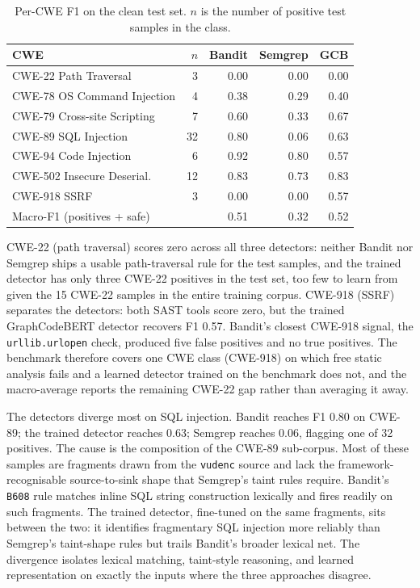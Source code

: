 \begin{table}[h]
\centering
\caption{Per-CWE F1 on the clean test set. $n$ is the number of
positive test samples in the class.}
\label{tab:clean-percwe}
\begin{tabular}{l r r r r}
\hline
CWE & $n$ & Bandit & Semgrep & GCB \\
\hline
CWE-22  Path Traversal        &  3 & 0.00 & 0.00 & 0.00 \\
CWE-78  OS Command Injection  &  4 & 0.38 & 0.29 & 0.40 \\
CWE-79  Cross-site Scripting  &  7 & 0.60 & 0.33 & 0.67 \\
CWE-89  SQL Injection         & 32 & 0.80 & 0.06 & 0.63 \\
CWE-94  Code Injection        &  6 & 0.92 & 0.80 & 0.57 \\
CWE-502 Insecure Deserial.    & 12 & 0.83 & 0.73 & 0.83 \\
CWE-918 SSRF                  &  3 & 0.00 & 0.00 & 0.57 \\
\hline
Macro-F1 (positives + safe)   &    & 0.51 & 0.32 & 0.52 \\
\hline
\end{tabular}
\end{table}

CWE-22 (path traversal) scores zero across all three detectors:
neither Bandit nor Semgrep ships a usable path-traversal rule for the
test samples, and the trained detector has only three CWE-22 positives
in the test set, too few to learn from given the 15 CWE-22 samples in
the entire training corpus. CWE-918 (SSRF) separates the detectors:
both SAST tools score zero, but the trained GraphCodeBERT detector
recovers F1 0.57. Bandit's closest CWE-918 signal, the
\texttt{urllib.urlopen} check, produced five false positives and no
true positives. The benchmark therefore covers one CWE class
(CWE-918) on which free static analysis fails and a learned detector
trained on the benchmark does not, and the macro-average reports the
remaining CWE-22 gap rather than averaging it away.

The detectors diverge most on SQL injection. Bandit reaches F1 0.80
on CWE-89; the trained detector reaches 0.63; Semgrep reaches 0.06,
flagging one of 32 positives. The cause is the composition of the
CWE-89 sub-corpus. Most of these samples are fragments drawn from
the \texttt{vudenc} source and lack the framework-recognisable
source-to-sink shape that Semgrep's taint rules require. Bandit's
\texttt{B608} rule matches inline SQL string construction lexically
and fires readily on such fragments. The trained detector, fine-tuned
on the same fragments, sits between the two: it identifies fragmentary
SQL injection more reliably than Semgrep's taint-shape rules but
trails Bandit's broader lexical net. The divergence isolates lexical
matching, taint-style reasoning, and learned representation on
exactly the inputs where the three approaches disagree.

